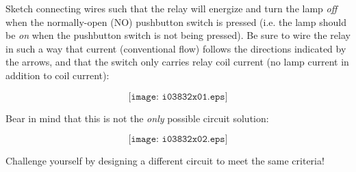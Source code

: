 

Sketch connecting wires such that the relay will energize and turn the lamp {\it off} when the normally-open (NO) pushbutton switch is pressed (i.e. the lamp should be {\it on} when the pushbutton switch is not being pressed).  Be sure to wire the relay in such a way that current (conventional flow) follows the directions indicated by the arrows, and that the switch only carries relay coil current (no lamp current in addition to coil current):

$$\texttt{[image: i03832x01.eps]}$$







Bear in mind that this is not the {\it only} possible circuit solution:

$$\texttt{[image: i03832x02.eps]}$$

Challenge yourself by designing a different circuit to meet the same criteria! 










